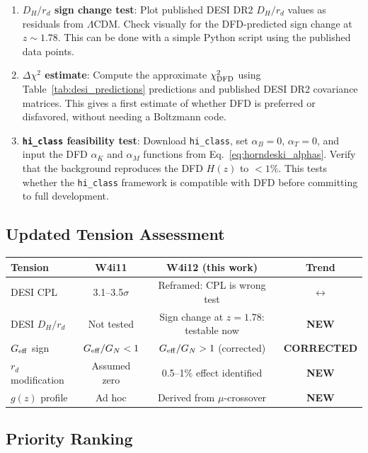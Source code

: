 \documentclass[11pt,a4paper]{article}
\newcommand{\LCDM}{$\Lambda$CDM}
\newcommand{\Geff}{G_{\rm eff}}
\newcommand{\hiclass}{\texttt{hi\_class}}
\begin{document}
\begin{enumerate}
\item \textbf{$D_H/r_d$ sign change test}: Plot published DESI DR2
  $D_H/r_d$ values as residuals from \LCDM{}. Check visually
  for the DFD-predicted sign change at $z \sim 1.78$. This can be
  done with a simple Python script using the published data points.

\item \textbf{$\Delta\chi^2$ estimate}: Compute the approximate
  $\chi^2_{\rm DFD}$ using Table~\ref{tab:desi_predictions}
  predictions and published DESI DR2 covariance matrices. This
  gives a first estimate of whether DFD is preferred or disfavored,
  without needing a Boltzmann code.

\item \textbf{\hiclass{} feasibility test}: Download \hiclass{},
  set $\alpha_B = 0$, $\alpha_T = 0$, and input the DFD $\alpha_K$
  and $\alpha_M$ functions from Eq.~\eqref{eq:horndeski_alphas}.
  Verify that the background reproduces the DFD $H(z)$ to $<1\%$.
  This tests whether the \hiclass{} framework is compatible with
  DFD before committing to full development.
\end{enumerate}

\subsection{Updated Tension Assessment}

\begin{center}
\begin{tabular}{lccc}
\toprule
\textbf{Tension} & \textbf{W4i11} & \textbf{W4i12 (this work)} &
\textbf{Trend} \\
\midrule
DESI CPL & 3.1--3.5$\sigma$ & Reframed: CPL is wrong test &
$\leftrightarrow$ \\
DESI $D_H/r_d$ & Not tested & Sign change at $z = 1.78$: testable
now & \textbf{NEW} \\
$\Geff$ sign & $G_{\rm eff}/G_N < 1$ & $G_{\rm eff}/G_N > 1$
(corrected) & \textbf{CORRECTED} \\
$r_d$ modification & Assumed zero & 0.5--1\% effect identified &
\textbf{NEW} \\
$g(z)$ profile & Ad hoc & Derived from $\mu$-crossover &
\textbf{NEW} \\
\bottomrule
\end{tabular}
\end{center}

\subsection{Priority Ranking}
\end{document}

